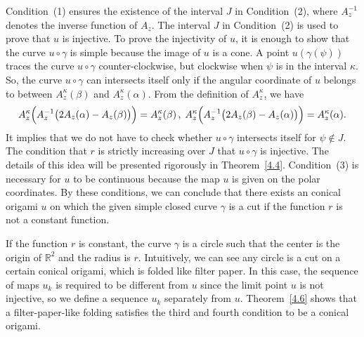 \documentclass{amsart}
\theoremstyle{plain}
\theoremstyle{definition}
\theoremstyle{remark}
\begin{document}
Condition~(1) ensures the existence of the interval $J$ in Condition~(2), where $A_z^{-1}$ denotes the inverse function of $A_z$.
The interval $J$ in Condition~(2) is used to prove that $u$ is injective.
To prove the injectivity of $u$, it is enough to show that the curve $u\circ\gamma$ is simple because the image of $u$ is a cone.
A point $u(\gamma(\psi))$ traces the curve $u\circ\gamma$ counter-clockwise, but clockwise when $\psi$ is in the interval $\kappa$.
So, the curve $u\circ\gamma$ can intersects itself only if the angular coordinate of $u$ belongs to between $A_z^{\kappa}(\beta)$ and $A_z^{\kappa}(\alpha)$.
From the definition of $A_z^{\kappa}$, we have
\begin{align*}
A_z^{\kappa}\Bigl(A_z^{-1}\bigl(2A_z(\alpha)-A_z(\beta)\bigr)\Bigr)=A_z^{\kappa}(\beta)\,,\; A_z^{\kappa}\Bigl(A_z^{-1}\bigl(2A_z(\beta)-A_z(\alpha)\bigr)\Bigr)=A_z^{\kappa}(\alpha).
\end{align*}
It implies that we do not have to check whether $u\circ\gamma$ intersects itself for $\psi\notin J$.
The condition that $r$ is strictly increasing over $J$ that $u\circ\gamma$ is injective.
The details of this idea will be presented rigorously in Theorem~\ref{4.4}.
Condition~(3) is necessary for $u$ to be continuous because the map $u$ is given on the polar coordinates.
By these conditions, we can conclude that there exists an conical origami $u$ on which the given simple closed curve $\gamma$ is a cut if the function $r$ is not a constant function.

If the function $r$ is constant, the curve $\gamma$ is a circle such that the center is the origin of $\mathbb{R}^2$ and the radius is $r$.
Intuitively, we can see any circle is a cut on a certain conical origami, which is folded like filter paper.
In this case, the sequence of maps $u_k$ is required to be different from $u$ since the limit point $u$ is not injective, so we define a sequence $u_k$ separately from $u$.
Theorem~\ref{4.6} shows that a filter-paper-like folding satisfies the third and fourth condition to be a conical origami.
\end{document}
